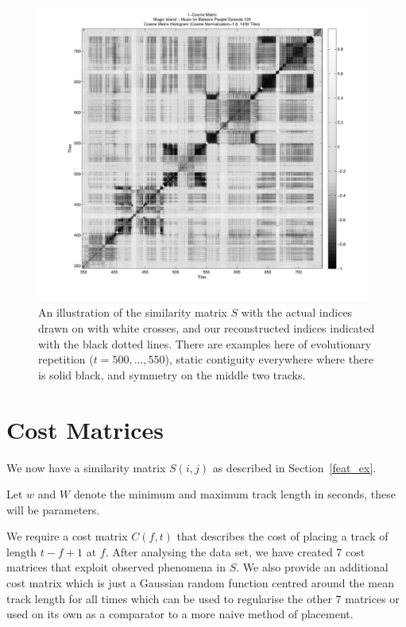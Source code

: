 \documentclass[twocolumn]{article}
\begin{document}
	\begin{figure}[t]
		\centering
		\includegraphics[width=1.08\textwidth]{images/S}
		\caption{An illustration of the similarity matrix $S$ with the actual indices drawn on with white crosses, and our reconstructed indices indicated with the black dotted lines. There are examples here of evolutionary repetition ($t=500,\ldots,550$), static contiguity everywhere where there is solid black, and symmetry on the middle two tracks.}
		\label{fig:simmatrix}
	\end{figure} 
	
	\section{Cost Matrices}\label{costmatrix_sec} %
	
	We now have a similarity matrix $S(i,j)$ as described in Section~\ref{feat_ex}. 
	
	Let $w$ and $W$ denote the minimum and maximum track length in seconds, these will be parameters.
	
	We require a cost matrix $C(f,t)$ that describes the cost of placing a track of length $t-f+1$ at $f$. After analysing the data set, we have created $7$ cost matrices that exploit observed phenomena in $S$. We also provide an additional cost matrix which is just a Gaussian random function centred around the mean track length for all times which can be used to regularise the other $7$ matrices or used on its own as a comparator to a more naive method of placement. 
	
\end{document}
